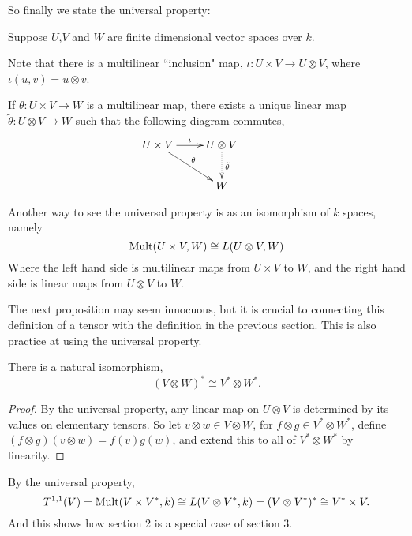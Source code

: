 So finally we state the universal property:
\begin{theorem}
    Suppose $U$,$V$ and $W$ are finite dimensional vector spaces over $k$.

    Note that there is a multilinear ``inclusion" map, $\iota:U\times V\rightarrow U\otimes V$,
    where $\iota(u,v) = u\otimes v$.

    If $\theta:U\times V\rightarrow W$ is a multilinear map, there exists
    a unique linear map $\tilde{\theta}:U\otimes V\rightarrow W$ such that the following
    diagram commutes,
    \begin{displaymath}
    \xymatrix{
        {U\times V} \ar[r]^\iota \ar[rd]^\theta &
         {U\otimes V} \ar@{.>}[d]^{\tilde{\theta}}&\\
         &
         W
    }    
    \end{displaymath}
    
\end{theorem}
Another way to see the universal property is as an isomorphism of $k$ spaces,
namely
\begin{equation*}
    \operatorname{Mult}(U\times V,W) \cong L(U\otimes V,W)
\end{equation*}
Where the left hand side is multilinear maps from $U\times V$ to $W$, and
the right hand side is linear maps from $U\otimes V$ to $W$.

The next proposition may seem innocuous, but it is crucial to connecting
this definition of a tensor with the definition in the previous section.
This is also practice at using the universal property.
\begin{proposition}
    There is a natural isomorphism,
    \begin{equation*}
        (V\otimes W)^* \cong V^*\otimes W^*.
    \end{equation*}
\end{proposition}
\begin{proof}
    By the universal property, any linear map on $U\otimes V$
    is determined by its values on elementary tensors. So let $v\otimes w \in V\otimes W$,
    for $f\otimes g \in V^*\otimes W^*$, define $(f\otimes g)(v\otimes w) = f(v)g(w)$,
    and extend this to all of $V^*\otimes W^*$ by linearity. 
\end{proof}

By the universal property,
\begin{equation*}
    T^{1,1}(V) = \operatorname{Mult}(V\times V^*,k) \cong L(V\otimes V^*,k) = (V\otimes V^*)^* \cong V^*\times V. 
\end{equation*}
And this shows how section 2 is a special case of section 3.


